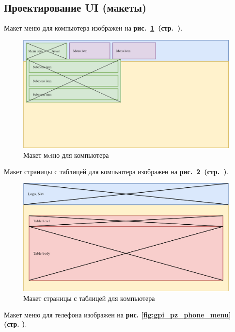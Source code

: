 \newpage

\subsection{Проектирование UI (макеты)}

Макет меню для компьютера изображен на
\textbf{рис.~\ref{fig:gpi_ui_menu}~(стр.~\pageref{fig:gpi_ui_menu})}.

\begin{figure}[!hp]
    \centering
    \includegraphics[width=12cm]
        {_assets/gpi_ui_menu.png}
    \caption{Макет мeню для компьютера}
    \label{fig:gpi_ui_menu}
\end{figure}

Макет страницы с таблицей для компьютера изображен на
\textbf{рис.~\ref{fig:gpi_ui_get}~(стр.~\pageref{fig:gpi_ui_get})}.

\begin{figure}[!hp]
    \centering
    \includegraphics[width=12cm]
        {_assets/gpi_ui_get.png}
    \caption{Макет страницы с таблицей для компьютера}
    \label{fig:gpi_ui_get}
\end{figure}

Макет меню для телефона изображен на
\textbf{рис. \ref{fig:gpi_pz_phone_menu} (стр. \pageref{fig:gpi_pz_phone_menu})}.

